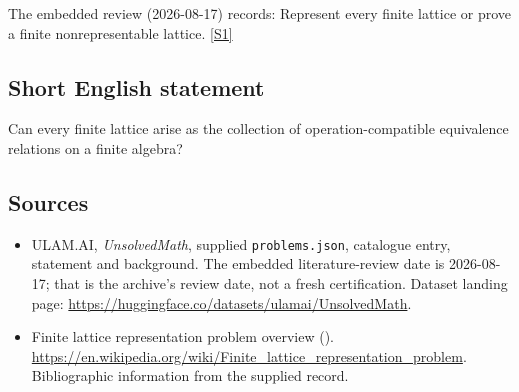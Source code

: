\documentclass[11pt,a4paper]{article}
\newcommand{\sref}[2]{\hyperlink{source:#1:#2}{[S#2]}}
\begin{document}
The embedded review (2026-08-17) records: Represent every finite lattice or prove a finite nonrepresentable lattice. \sref{statement}{1}

\subsection{Short English statement}

Can every finite lattice arise as the collection of operation-compatible equivalence relations on a finite algebra?

\subsection{Sources}

{\small

\begin{itemize}

\item[\hypertarget{source:statement:1}{S1}] ULAM.AI, \emph{UnsolvedMath}, supplied \texttt{problems.json}, catalogue entry, statement and background. The embedded literature-review date is 2026-08-17; that is the archive’s review date, not a fresh certification. Dataset landing page: \url{https://huggingface.co/datasets/ulamai/UnsolvedMath}.

\item[\hypertarget{source:statement:2}{S2}] Finite lattice representation problem overview (). \url{https://en.wikipedia.org/wiki/Finite_lattice_representation_problem}. Bibliographic information from the supplied record.

\end{itemize}

}

\label{end:statement}
\end{document}
